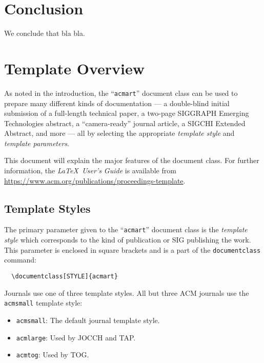 \documentclass[sigconf]{acmart}
\begin{document}
\section{Conclusion}
\label{conclusion}
We conclude that bla bla.















\section{Template Overview}
As noted in the introduction, the ``\verb|acmart|'' document class can
be used to prepare many different kinds of documentation --- a
double-blind initial submission of a full-length technical paper, a
two-page SIGGRAPH Emerging Technologies abstract, a ``camera-ready''
journal article, a SIGCHI Extended Abstract, and more --- all by
selecting the appropriate {\itshape template style} and {\itshape
  template parameters}.

This document will explain the major features of the document
class. For further information, the {\itshape \LaTeX\ User's Guide} is
available from
\url{https://www.acm.org/publications/proceedings-template}.

\subsection{Template Styles}

The primary parameter given to the ``\verb|acmart|'' document class is
the {\itshape template style} which corresponds to the kind of publication
or SIG publishing the work. This parameter is enclosed in square
brackets and is a part of the {\verb|documentclass|} command:
\begin{verbatim}
  \documentclass[STYLE]{acmart}
\end{verbatim}

Journals use one of three template styles. All but three ACM journals
use the {\verb|acmsmall|} template style:
\begin{itemize}
\item {\verb|acmsmall|}: The default journal template style.
\item {\verb|acmlarge|}: Used by JOCCH and TAP.
\item {\verb|acmtog|}: Used by TOG.
\end{itemize}
\end{document}
